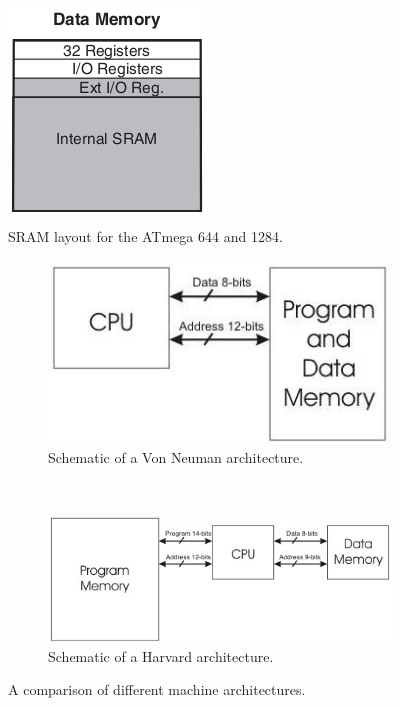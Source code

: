 \documentclass[12pt,a4paper,twocolumn]{article}
\begin{document}
	\begin{figure}
		\includegraphics[scale=1]{img/stack.png}
		\caption{SRAM layout for the ATmega 644 and 1284.}
		\label{fig:stack}		
	\end{figure}
	
\begin{figure}
	\begin{subfigure}[b]{0.3\textwidth}
		\includegraphics[scale=0.65]{img/von_neuman_arch.jpg}
		\caption{Schematic of a Von Neuman architecture.}
		\label{fig:VN_arch}
	\end{subfigure} \\
	
	\begin{subfigure}[b]{0.3\textwidth}
		\includegraphics[scale=0.5]{img/harvard_arch.jpeg}
		\caption{Schematic of a Harvard architecture.}
		\label{fig:H_arch}
	\end{subfigure}
	\caption{A comparison of different machine architectures.}
	\label{fig:architectures}
\end{figure}	
		
\end{document}
